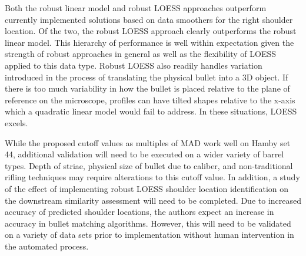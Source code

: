 \documentclass[12pt]{article}
\begin{document}
Both the robust linear model and robust LOESS approaches outperform
currently implemented solutions based on data smoothers for the right
shoulder location. Of the two, the robust LOESS approach clearly
outperforms the robust linear model. This hierarchy of performance is
well within expectation given the strength of robust approaches in
general as well as the flexibility of LOESS applied to this data type.
Robust LOESS also readily handles variation introduced in the process of
translating the physical bullet into a 3D object. If there is too much
variability in how the bullet is placed relative to the plane of
reference on the microscope, profiles can have tilted shapes relative to
the x-axis which a quadratic linear model would fail to address. In
these situations, LOESS excels.

While the proposed cutoff values as multiples of MAD work well on Hamby
set 44, additional validation will need to be executed on a wider
variety of barrel types. Depth of striae, physical size of bullet due to
caliber, and non-traditional rifling techniques may require alterations
to this cutoff value. In addition, a study of the effect of implementing
robust LOESS shoulder location identification on the downstream
similarity assessment will need to be completed. Due to increased
accuracy of predicted shoulder locations, the authors expect an increase
in accuracy in bullet matching algorithms. However, this will need to be
validated on a variety of data sets prior to implementation without
human intervention in the automated process.



\end{document}
